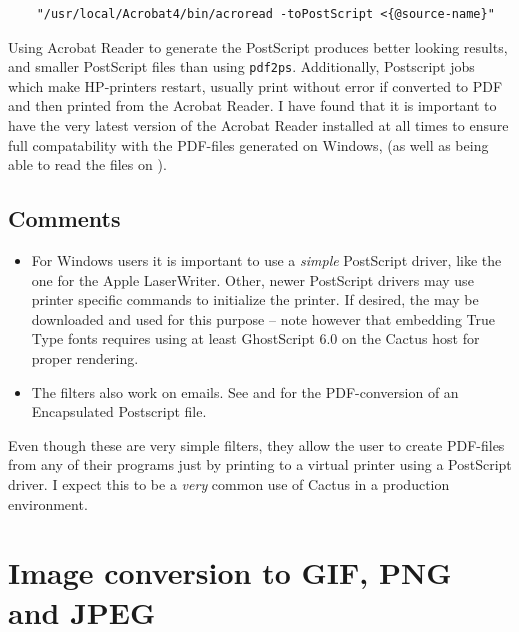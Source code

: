 \begin{verbatim}
    "/usr/local/Acrobat4/bin/acroread -toPostScript <{@source-name}"
\end{verbatim}

Using Acrobat Reader to generate the PostScript produces better
looking results, and smaller PostScript files than using
\texttt{pdf2ps}.  Additionally, Postscript jobs which make HP-printers
restart, usually print without error if converted to PDF and then
printed from the Acrobat Reader.  I have found that it is important to
have the very latest version of the Acrobat Reader installed at all
times to ensure full compatability with the PDF-files generated on
Windows, (as well as being able to read the files on
).

\subsection*{Comments}

\begin{itemize}
\item For Windows users it is important to use a \textit{simple}
  PostScript driver, like the one for the Apple LaserWriter.  Other,
  newer PostScript drivers may use printer specific commands to
  initialize the printer.  If desired, the
   may be downloaded and used for this
  purpose -- note however that embedding True Type fonts requires
  using at least GhostScript 6.0 on the Cactus host for proper
  rendering.

\item The filters also work on emails.  See
   and
   for the PDF-conversion
  of an Encapsulated Postscript file.

\end{itemize}

Even though these are very simple filters, they allow the user to
create PDF-files from any of their programs just by printing to a
virtual printer using a PostScript driver.  I expect this to be a \textit{very}
common use of Cactus in a production environment.

\section{Image conversion to GIF, PNG and JPEG}
\label{sec:image-conversion}

